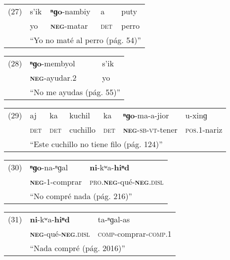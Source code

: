{\setmainfont{Charis SIL}

\begin{tabular}{lllll}
 (27) & s'ik & \textbf{ⁿɡo}-nambiy & a & puty\\
& yo & \textsc{\textbf{neg}}-matar & \textsc{det} & perro \\
& \multicolumn{4}{l}{``Yo no maté al perro (pág. 54)''}
\end{tabular}\vspace{0.15cm}

\begin{tabular}{lll}
(28) & \textbf{ⁿɡo}-membyol & s'ik \\
& \textsc{\textbf{neg}}-ayudar.2 & yo \\
& \multicolumn{2}{l}{``No me ayudas (pág. 55)''} \\
\end{tabular} \vspace{0.15cm}

\begin{tabular}{lllllll}
(29) & aj & ka & kuchil & ka & \textbf{ⁿɡo}-ma-a-jior & u-xinɡ \\
& \textsc{det} & \textsc{det} & cuchillo & \textsc{det} & \textsc{\textbf{neg}-sb-vt}-tener & \textsc{pos.1}-nariz \\
& \multicolumn{6}{l}{``Este cuchillo no tiene filo (pág. 124)''} \\
\end{tabular} \vspace{0.15cm}

\begin{tabular}{lll}
(30) & \textbf{ⁿɡo}-na-ⁿɡal & \textbf{ni}-kʷa-\textbf{hiⁿd} \\
& \textsc{\textbf{neg}}-1-comprar & \textsc{pro.\textbf{neg}}-qué-\textsc{\textbf{neg}.disl} \\
& \multicolumn{2}{l}{``No compré nada (pág. 216)''} \\
\end{tabular} \vspace{0.15cm}

\begin{tabular}{lll}
(31) & \textbf{ni}-kʷa-\textbf{hiⁿd} & ta-ⁿɡal-as \\
& \textsc{\textbf{neg}}-qué-\textsc{\textbf{neg}.disl} & \textsc{comp}-comprar-\textsc{comp.1} \\
& \multicolumn{2}{l}{``Nada compré (pág. 2016)''} \\
\end{tabular} \vspace{0.2cm}

}


